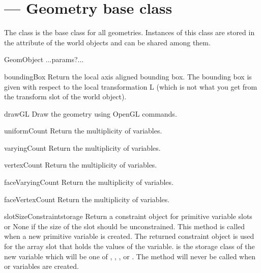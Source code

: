 
\section{ ---
         Geometry base class}

The  class is the base class for all geometries.
Instances of this class are stored in the  attribute
of the world objects and can be shared among them.

\begin{classdesc}{GeomObject}{}
...params?...
\end{classdesc}

\begin{methoddesc}{boundingBox}{}
Return the local axis aligned bounding box. The bounding box is
given with respect to the local transformation L (which is not
what you get from the transform slot of the world object).
\end{methoddesc}

\begin{methoddesc}{drawGL}{}
Draw the geometry using OpenGL commands.
\end{methoddesc}

\begin{methoddesc}{uniformCount}{}
Return the multiplicity of  variables.
\end{methoddesc}

\begin{methoddesc}{varyingCount}{}
Return the multiplicity of  variables.
\end{methoddesc}

\begin{methoddesc}{vertexCount}{}
Return the multiplicity of  variables.
\end{methoddesc}

\begin{methoddesc}{faceVaryingCount}{}
Return the multiplicity of  variables.
\end{methoddesc}

\begin{methoddesc}{faceVertexCount}{}
Return the multiplicity of  variables.
\end{methoddesc}

\begin{methoddesc}{slotSizeConstraint}{storage}
Return a constraint object for primitive variable slots or None if the size
of the slot should be unconstrained.
This method is called when a new primitive variable is created. The
returned constraint object is used for the array slot that holds the
values of the variable.  is the storage class of the new
variable which will be one of , , ,
 or . The method will never be called
when  or  variables are created.
\end{methoddesc}

